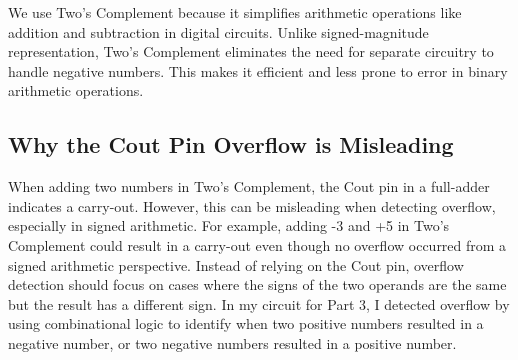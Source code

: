 \documentclass[12pt]{article}
\begin{document}
We use Two’s Complement because it simplifies arithmetic operations like addition and subtraction in digital circuits. Unlike signed-magnitude representation, Two’s Complement eliminates the need for separate circuitry to handle negative numbers. This makes it efficient and less prone to error in binary arithmetic operations.

\subsection*{Why the Cout Pin Overflow is Misleading}
When adding two numbers in Two’s Complement, the Cout pin in a full-adder indicates a carry-out. However, this can be misleading when detecting overflow, especially in signed arithmetic. For example, adding -3 and +5 in Two’s Complement could result in a carry-out even though no overflow occurred from a signed arithmetic perspective. Instead of relying on the Cout pin, overflow detection should focus on cases where the signs of the two operands are the same but the result has a different sign. In my circuit for Part 3, I detected overflow by using combinational logic to identify when two positive numbers resulted in a negative number, or two negative numbers resulted in a positive number.
\end{document}
